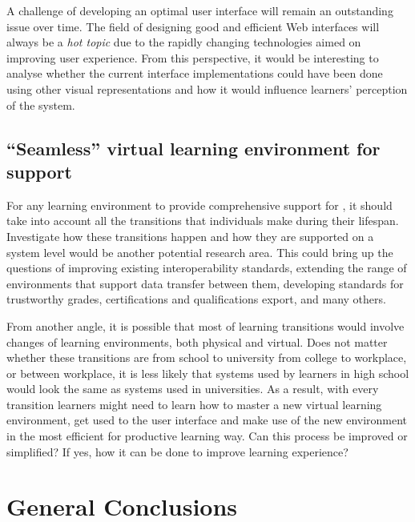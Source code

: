 A challenge of developing an optimal user interface will remain an outstanding
issue over time. The field of designing good and efficient Web interfaces will
always be a \textit{hot topic} due to the rapidly changing technologies aimed on
improving user experience. From this perspective, it would be interesting to
analyse whether the current interface implementations could have been done using
other visual representations and how it would influence learners' perception of
the system.

\subsection[``Seamless'' environment for \LLLs support]{``Seamless'' virtual
learning environment for \LLLs support} 
For any learning environment to provide comprehensive support for \LLLs, it
should take into account all the transitions that individuals make during their
lifespan. Investigate how these transitions happen and how they are supported on
a system level would be another potential research area. This could bring up the
questions of improving existing interoperability standards, extending the range
of environments that support data transfer between them, developing standards
for trustworthy grades, certifications and qualifications export, and many
others.

From another angle, it is possible that most of learning transitions would
involve changes of learning environments, both physical and virtual. Does not
matter whether these transitions are from school to university from college to
workplace, or between workplace, it is less likely that systems used by learners
in high school would look the same as systems used in universities. As a result,
with every transition learners might need to learn how to master a new virtual
learning environment, get used to the user interface and make use of the new
environment in the most efficient for productive learning way. Can this process
be improved or simplified? If yes, how it can be done to improve learning
experience?

\section{General Conclusions}

